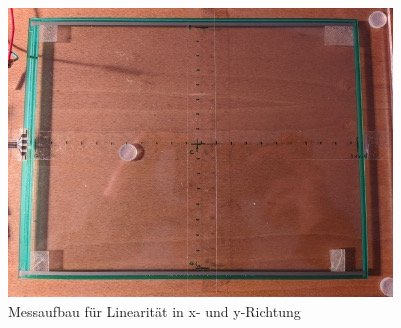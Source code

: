 \begin{figure}[ht!]
    \centering
    \includegraphics[width=0.6\linewidth]{fig/raster/messlinear.jpg}
    \caption{Messaufbau für Linearität in x- und y-Richtung}
    \label{fig:messlinear}
\end{figure}

\begin{figure}[ht!]
    \centering
    
    \caption{}
    \label{fig:xlinear}
    
    \caption{}
    \label{fig:ylinear}
\end{figure}
